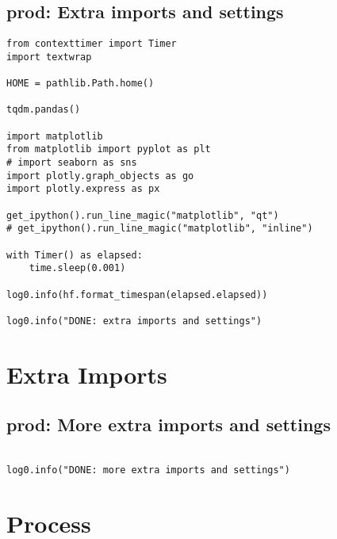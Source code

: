 \documentclass[a4paper,10pt,onecolumn,oneside,openright]{article}
\begin{document}
\subsection{prod: Extra imports and settings}
\label{sec:org6e9b303}
\begin{verbatim}
from contexttimer import Timer
import textwrap

HOME = pathlib.Path.home()

tqdm.pandas()

import matplotlib
from matplotlib import pyplot as plt
# import seaborn as sns
import plotly.graph_objects as go
import plotly.express as px

get_ipython().run_line_magic("matplotlib", "qt")
# get_ipython().run_line_magic("matplotlib", "inline")

with Timer() as elapsed:
    time.sleep(0.001)

log0.info(hf.format_timespan(elapsed.elapsed))

log0.info("DONE: extra imports and settings")
\end{verbatim}

\section{Extra Imports}
\label{sec:org7d7b357}
\subsection{prod: More extra imports and settings}
\label{sec:orgdb32942}
\begin{verbatim}

log0.info("DONE: more extra imports and settings")
\end{verbatim}

\section{Process}
\label{sec:orga814f15}
\end{document}
